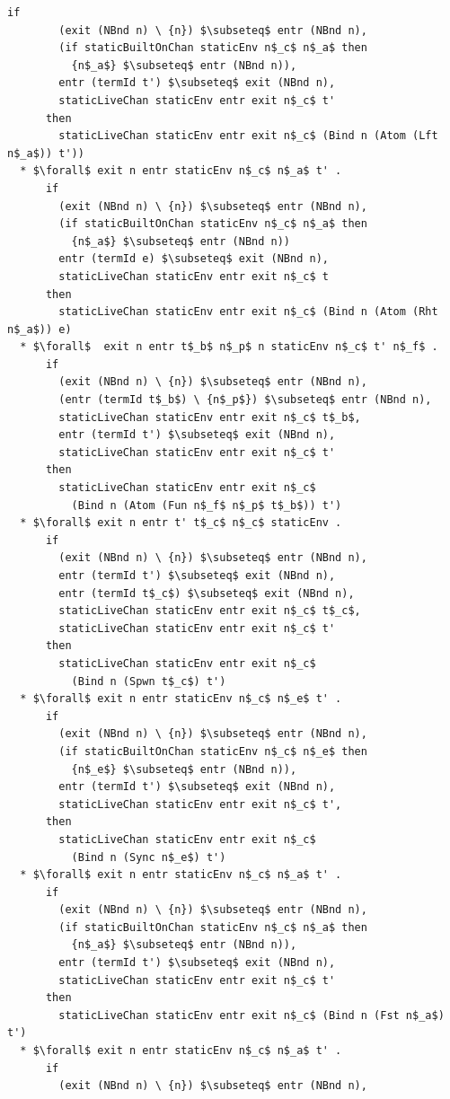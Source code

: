 \documentclass[letterpaper, 11pt]{extarticle}
\begin{document}
\begin{lstlisting}[language=logic, mathescape]
      if
        (exit (NBnd n) \ {n}) $\subseteq$ entr (NBnd n),
        (if staticBuiltOnChan staticEnv n$_c$ n$_a$ then
          {n$_a$} $\subseteq$ entr (NBnd n)),
        entr (termId t') $\subseteq$ exit (NBnd n),
        staticLiveChan staticEnv entr exit n$_c$ t'
      then
        staticLiveChan staticEnv entr exit n$_c$ (Bind n (Atom (Lft n$_a$)) t'))
  * $\forall$ exit n entr staticEnv n$_c$ n$_a$ t' . 
      if
        (exit (NBnd n) \ {n}) $\subseteq$ entr (NBnd n),
        (if staticBuiltOnChan staticEnv n$_c$ n$_a$ then
          {n$_a$} $\subseteq$ entr (NBnd n))
        entr (termId e) $\subseteq$ exit (NBnd n),
        staticLiveChan staticEnv entr exit n$_c$ t
      then
        staticLiveChan staticEnv entr exit n$_c$ (Bind n (Atom (Rht n$_a$)) e)
  * $\forall$  exit n entr t$_b$ n$_p$ n staticEnv n$_c$ t' n$_f$ . 
      if
        (exit (NBnd n) \ {n}) $\subseteq$ entr (NBnd n),
        (entr (termId t$_b$) \ {n$_p$}) $\subseteq$ entr (NBnd n),
        staticLiveChan staticEnv entr exit n$_c$ t$_b$,
        entr (termId t') $\subseteq$ exit (NBnd n),
        staticLiveChan staticEnv entr exit n$_c$ t'
      then
        staticLiveChan staticEnv entr exit n$_c$
          (Bind n (Atom (Fun n$_f$ n$_p$ t$_b$)) t')
  * $\forall$ exit n entr t' t$_c$ n$_c$ staticEnv .
      if
        (exit (NBnd n) \ {n}) $\subseteq$ entr (NBnd n),
        entr (termId t') $\subseteq$ exit (NBnd n),
        entr (termId t$_c$) $\subseteq$ exit (NBnd n),
        staticLiveChan staticEnv entr exit n$_c$ t$_c$,
        staticLiveChan staticEnv entr exit n$_c$ t'
      then
        staticLiveChan staticEnv entr exit n$_c$
          (Bind n (Spwn t$_c$) t')
  * $\forall$ exit n entr staticEnv n$_c$ n$_e$ t' .
      if
        (exit (NBnd n) \ {n}) $\subseteq$ entr (NBnd n),
        (if staticBuiltOnChan staticEnv n$_c$ n$_e$ then
          {n$_e$} $\subseteq$ entr (NBnd n)),
        entr (termId t') $\subseteq$ exit (NBnd n),
        staticLiveChan staticEnv entr exit n$_c$ t',
      then
        staticLiveChan staticEnv entr exit n$_c$
          (Bind n (Sync n$_e$) t')
  * $\forall$ exit n entr staticEnv n$_c$ n$_a$ t' .
      if
        (exit (NBnd n) \ {n}) $\subseteq$ entr (NBnd n),
        (if staticBuiltOnChan staticEnv n$_c$ n$_a$ then
          {n$_a$} $\subseteq$ entr (NBnd n)),
        entr (termId t') $\subseteq$ exit (NBnd n),
        staticLiveChan staticEnv entr exit n$_c$ t'
      then
        staticLiveChan staticEnv entr exit n$_c$ (Bind n (Fst n$_a$) t')
  * $\forall$ exit n entr staticEnv n$_c$ n$_a$ t' .
      if 
        (exit (NBnd n) \ {n}) $\subseteq$ entr (NBnd n),

\end{lstlisting}
\end{document}
